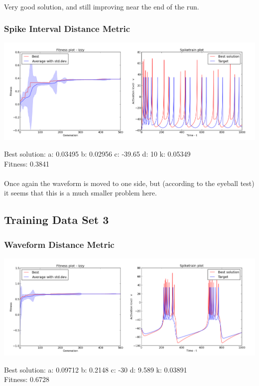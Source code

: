 \documentclass[a4paper,12pt]{article}
\begin{document}
\paragraph{}Very good solution, and still improving near the end of the run.

\subsubsection{Spike Interval Distance Metric}
\centerline{\includegraphics[width=1.0\textwidth]{img/case2_int}}
Best solution: 
a: 0.03495 
b: 0.02956 
c: -39.65 
d: 10 
k: 0.05349 \\
Fitness: 0.3841
\paragraph{}Once again the waveform is moved to one side, but (according to the eyeball test) it seems that this is a much smaller problem here.

\subsection{Training Data Set 3}
\subsubsection{Waveform Distance Metric}
\centerline{\includegraphics[width=1.0\textwidth]{img/case3_wave}}
Best solution: 
a: 0.09712 
b: 0.2148 
c: -30 
d: 9.589 
k: 0.03891 \\
Fitness: 0.6728
\end{document}
